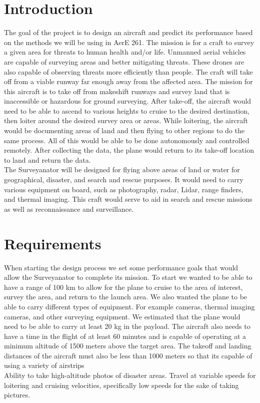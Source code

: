 \documentclass[12pt,A4paper]{article}
\begin{document}
	\section{Introduction}
	\indent The goal of the project is to design an aircraft and predict its performance based on the methods we will be using in AerE 261. The mission is for a craft to survey a given area for threats to human health and/or life. Unmanned aerial vehicles are capable of surveying areas and better mitigating threats. These drones are also capable of observing threats more efficiently than people. The craft will take off from a viable runway far enough away from the affected area. The mission for this aircraft is to take off from makeshift runways and survey land that is inaccessible or hazardous for ground surveying. After take-off, the aircraft would need to be able to ascend to various heights to cruise to the desired destination, then loiter around the desired survey area or areas. While loitering, the aircraft would be documenting areas of land and then flying to other regions to do the same process. All of this would be able to be done autonomously and controlled remotely. After collecting the data, the plane would return to its take-off location to land and return the data. \\
	\indent The Surveyanator will be designed for flying above areas of land or water for geographical, disaster, and search and rescue purposes. It would need to carry various equipment on board, such as photography, radar, Lidar, range finders, and thermal imaging. This craft would serve to aid in search and rescue missions as well as reconnaissance and surveillance.

	\section{Requirements}
	\indent When starting the design process we set some performance goals that would allow the Surveyanator to complete its mission. To start we wanted to be able to have a range of 100 km to allow for the plane to cruise to the area of interest, survey the area, and return to the launch area. We also wanted the plane to be able to carry different types of equipment. For example cameras, thermal imaging cameras, and other surveying equipment. We estimated that the plane would need to be able to carry at least 20 kg in the payload. The aircraft also needs to have a time in the flight of at least 60 minutes and is capable of operating at a minimum altitude of 1500 meters above the target area. The takeoff and landing distances of the aircraft must also be less than 1000 meters so that its capable of using a variety of airstrips \\
	\indent Ability to take high-altitude photos of disaster areas. Travel at variable speeds for loitering and cruising velocities, specifically low speeds for the sake of taking pictures.
\end{document}

